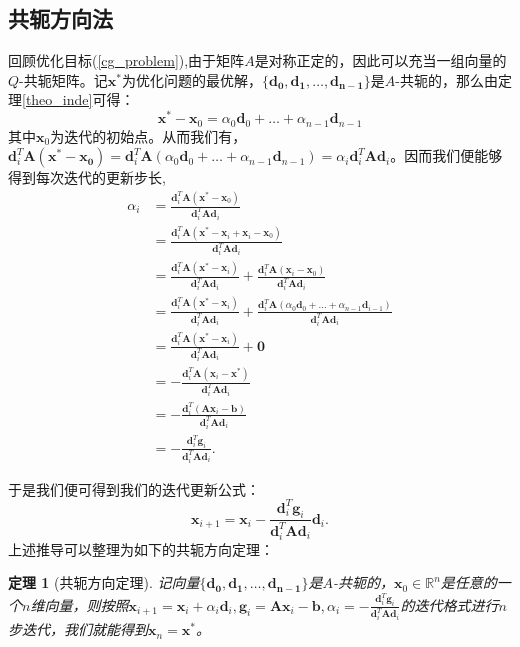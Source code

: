\documentclass{ctexart}
\newtheorem{Theo}{\hspace{2em}定理}
\begin{document}
\subsection{共轭方向法}
回顾优化目标(\ref{cg_problem}),由于矩阵$A$是对称正定的，因此可以充当一组向量的$Q$-共轭矩阵。记$\mathbf{x}^*$为优化问题的最优解，$\{\mathbf{d_0,d_1,\dots,d_{n-1}}\}$是$A$-共轭的，那么由定理\ref{theo_inde}可得：
\begin{equation}
\mathbf{x}^*-\mathbf{x}_0=\alpha_0\mathbf{d}_0+\dots+\alpha_{n-1}\mathbf{d}_{n-1}
\end{equation}
其中$\mathbf{x}_0$为迭代的初始点。从而我们有，$\mathbf{d}_i^T\mathbf{A}(\mathbf{x^*-x_0})=\mathbf{d}_i^T\mathbf{A}(\alpha_0\mathbf{d}_0+\dots+\alpha_{n-1}\mathbf{d}_{n-1})=\alpha_i\mathbf{d}_i^T\mathbf{A}\mathbf{d}_i$。因而我们便能够得到每次迭代的更新步长,
\begin{align*}
\alpha_i&=\frac{\mathbf{d}_i^T\mathbf{A}(\mathbf{x}^*-\mathbf{x}_0)}{\mathbf{d}_i^T\mathbf{Ad}_i}\\&=\frac{\mathbf{d}_i^T\mathbf{A}(\mathbf{x}^*-\mathbf{x}_i+\mathbf{x}_i-\mathbf{x}_0)}{\mathbf{d}_i^T\mathbf{Ad}_i}\\&=\frac{\mathbf{d}_i^T\mathbf{A}(\mathbf{x}^*-\mathbf{x}_i)}{\mathbf{d}_i^T\mathbf{Ad}_i}+\frac{\mathbf{d}_i^T\mathbf{A}(\mathbf{x}_i-\mathbf{x}_0)}{\mathbf{d}_i^T\mathbf{Ad}_i}\\&=\frac{\mathbf{d}_i^T\mathbf{A}(\mathbf{x}^*-\mathbf{x}_i)}{\mathbf{d}_i^T\mathbf{Ad}_i}+\frac{\mathbf{d}_i^T\mathbf{A}(\alpha_0\mathbf{d}_0+\dots+\alpha_{n-1}\mathbf{d}_{i-1})}{\mathbf{d}_i^T\mathbf{Ad}_i}\\&=\frac{\mathbf{d}_i^T\mathbf{A}(\mathbf{x}^*-\mathbf{x}_i)}{\mathbf{d}_i^T\mathbf{Ad}_i}+\mathbf{0}\\&=-\frac{\mathbf{d}_i^T\mathbf{A}(\mathbf{x}_i-\mathbf{x}^*)}{\mathbf{d}_i^T\mathbf{Ad}_i}\\&=-\frac{\mathbf{d}_i^T(\mathbf{A}\mathbf{x}_i-\mathbf{b})}{\mathbf{d}_i^T\mathbf{Ad}_i}\\&=-\frac{\mathbf{d}_i^T\mathbf{g}_i}{\mathbf{d}_i^T\mathbf{Ad}_i}.
\end{align*}


于是我们便可得到我们的迭代更新公式：
\begin{equation}
\mathbf{x}_{i+1} = \mathbf{x}_i -\frac{\mathbf{d}_i^T\mathbf{g}_i}{\mathbf{d}_i^T\mathbf{Ad}_i}\mathbf{d}_i.\label{update}
\end{equation}
上述推导可以整理为如下的共轭方向定理：
\begin{Theo}
	[共轭方向定理]记向量$\{\mathbf{d_0,d_1,\dots,d_{n-1}}\}$是$A$-共轭的，$\mathbf{x}_0\in \mathbb{R}^n$是任意的一个$n$维向量，则按照$\mathbf{x}_{i+1}=\mathbf{x}_i+\alpha_i\mathbf{d}_i,\mathbf{g}_i=\mathbf{Ax}_i-\mathbf{b},\alpha_i=-\frac{\mathbf{d}_i^T\mathbf{g}_i}{\mathbf{d}_i^T\mathbf{Ad}_i}$的迭代格式进行$n$步迭代，我们就能得到$\mathbf{x}_n=\mathbf{x}^*$。
\end{Theo}
\end{document}
